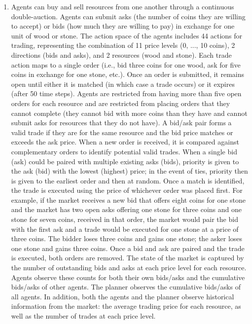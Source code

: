\documentclass{article}
\begin{document}
\begin{enumerate}
\item Agents can buy and sell resources from one another through a continuous double-auction. Agents can submit asks (the number of coins they are willing to accept) or bids (how much they are willing to pay) in exchange for one unit of wood or stone. The action space of the agents includes 44 actions for trading, representing the combination of 11 price levels (0, ..., 10 coins), 2 directions (bids and asks), and 2 resources (wood and stone). Each trade action maps to a single order (i.e., bid three coins for one wood, ask for five coins in exchange for one stone, etc.). Once an order is submitted, it remains open until either it is matched (in which case a trade occurs) or it expires (after 50 time steps). Agents are restricted from having more than five open orders for each resource and are restricted from placing orders that they cannot complete (they cannot bid with more coins than they have and cannot submit asks for resources that they do not have). A bid/ask pair forms a valid trade if they are for the same resource and the bid price matches or exceeds the ask price. When a new order is received, it is compared against complementary orders to identify potential valid trades. When a single bid (ask) could be paired with multiple existing asks (bids), priority is given to the ask (bid) with the lowest (highest) price; in the event of ties, priority then is given to the earliest order and then at random. Once a match is identified, the trade is executed using the price of whichever order was placed first. For example, if the market receives a new bid that offers eight coins for one stone and the market has two open asks offering one stone for three coins and one stone for seven coins, received in that order, the market would pair the bid with the first ask and a trade would be executed for one stone at a price of three coins. The bidder loses three coins and gains one stone; the asker loses one stone and gains three coins. Once a bid and ask are paired and the trade is executed, both orders are removed. The state of the market is captured by the number of outstanding bids and asks at each price level for each resource. Agents observe these counts for both their own bids/asks and the cumulative bids/asks of other agents. The planner observes the cumulative bids/asks of all agents. In addition, both the agents and the planner observe historical information from the market: the average trading price for each resource, as well as the number of trades at each price level.


\end{enumerate}
\end{document}

